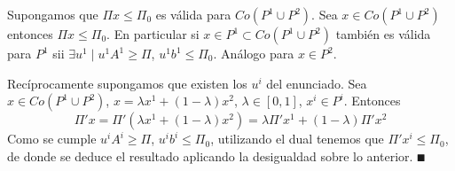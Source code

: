 \documentclass[MIOP.tex]{subfiles}
\begin{document}
\begin{dem}
Supongamos que $\Pi x \leq \Pi_0$ es válida para $ Co(P^1\cup P^2)$. Sea $x \in Co(P^1\cup P^2)$ entonces $\Pi x \leq \Pi_0$. En particular si $x\in P^1 \subset Co(P^1\cup P^2)$ también es válida para $P^1$ sii $\exists u^1\mid u^1 A^1 \geq \Pi$, $u^1 b^1 \leq \Pi_0$. Análogo para $x\in P^2$.

Recíprocamente supongamos que existen los $u^i$ del enunciado. Sea $x\in Co(P^1\cup P^2)$, $x=\lambda x^1 +(1-\lambda)x^2$, $\lambda \in [0,1]$, $x^i\in P^i$. Entonces 
$$
\Pi' x = \Pi'(\lambda x^1 +(1-\lambda)x^2) = \lambda \Pi' x^1 +(1-\lambda)\Pi' x^2
$$
Como se cumple $u^i A^i \geq \Pi$, $u^i b^i \leq \Pi_0$, utilizando el dual tenemos que $\Pi'x^i\leq\Pi_0$, de donde se deduce el resultado aplicando la desigualdad sobre lo anterior. $\QED$
\end{dem}
\end{document}
